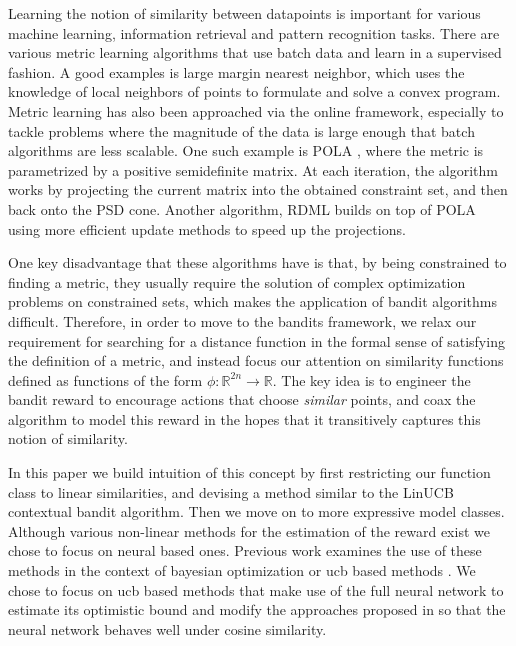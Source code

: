 \documentclass{article}
\begin{document}
Learning the notion of similarity between datapoints is important for various machine learning, information retrieval and pattern recognition tasks.
There are various metric learning algorithms that use batch data and learn in a supervised fashion.\cite{metric-learning}
A good examples is large margin nearest neighbor, which uses the knowledge of local neighbors of points to formulate and solve a convex program.\cite{understanding-machine-learning}
Metric learning has also been approached via the online framework, especially to tackle problems where the magnitude of the data is large enough that batch algorithms are less scalable.
One such example is POLA \cite{pola}, where the metric is parametrized by a positive semidefinite matrix.
At each iteration, the algorithm works by projecting the current matrix into the obtained constraint set, and then back onto the PSD cone.
Another algorithm, RDML \cite{rdml} builds on top of POLA using more efficient update methods to speed up the projections.

One key disadvantage that these algorithms have is that, by being constrained to finding a metric, they usually require the solution of complex optimization problems on constrained sets,
which makes the application of bandit algorithms difficult.
Therefore, in order to move to the bandits framework, we relax our requirement for searching for a distance function in the formal sense of satisfying the definition of a metric, and instead focus our attention on similarity functions defined as functions of the form $\phi: \mathbb{R}^{2n} \to \mathbb{R}$.
The key idea is to engineer the bandit reward to encourage actions that choose \textit{similar} points, and coax the algorithm to model this reward in the hopes that it transitively captures this notion of similarity.

In this paper we build intuition of this concept by first restricting our function class to linear similarities, and devising a method similar to the LinUCB contextual bandit algorithm\cite{linucb}.
Then we move on to more expressive model classes.
Although various non-linear methods for the estimation of the reward exist we chose to focus on neural based ones.
Previous work examines the use of these methods in the context of bayesian optimization \cite{deep-bayesian-bandits-show-down} or ucb based methods \cite{neuralucb}\cite{shallow}.
We chose to focus on ucb based methods that make use of the full neural network to estimate its optimistic bound and modify the approaches proposed in \cite{neuralucb}
so that the neural network behaves well under cosine similarity.
\end{document}
